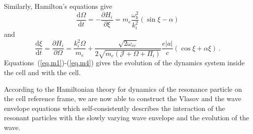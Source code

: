 Similarly, Hamilton's equations  give
\begin{equation}\label{eq.m1}
    \frac{\mathrm{d}\Omega}{\mathrm{d}t} = - \frac{\partial H_i}{\partial \xi} = m_e \frac{\omega_b^2}{k_i^2}\left(\sin \xi - \alpha \right)
\end{equation}
and 
\begin{equation}\label{eq.m2}
    \frac{\mathrm{d}\xi}{\mathrm{d}t} = \frac{\partial H_i}{\partial \Omega} =\frac{k_{i}^{2}\Omega}{ m_{e}}+ \frac{\sqrt{2\omega_{ce}} }{2\sqrt{m_e (\mathcal{J}+\Omega+\Pi_i)}}\frac{e |a|}{c}(\cos \xi + \alpha \xi)~.
\end{equation}
Equations~(\ref{eq.m1})-(\ref{eq.m4}) gives the evolution of the dynamics system inside the cell and with the cell. 

According to the Hamiltonian theory for dynamics of the resonance particle on the cell reference frame, we are now able to construct the Vlasov and the wave envelope equations which self-consistently describes the interaction of the resonant particles with the slowly varying wave envelope and the evolution of the wave.

